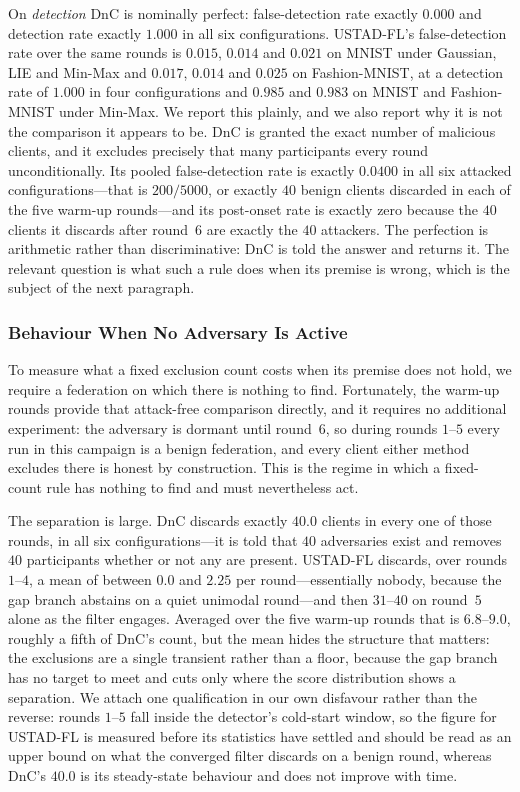 \documentclass[journal]{IEEEtran}
\begin{document}
On \emph{detection} DnC is nominally perfect: false-detection rate exactly $0.000$ and detection rate exactly $1.000$ in all six configurations. USTAD-FL's false-detection rate over the same rounds is $0.015$, $0.014$ and $0.021$ on MNIST under Gaussian, LIE and Min-Max and $0.017$, $0.014$ and $0.025$ on Fashion-MNIST, at a detection rate of $1.000$ in four configurations and $0.985$ and $0.983$ on MNIST and Fashion-MNIST under Min-Max. We report this plainly, and we also report why it is not the comparison it appears to be. DnC is granted the exact number of malicious clients, and it excludes precisely that many participants every round unconditionally. Its pooled false-detection rate is exactly $0.0400$ in all six attacked configurations---that is $200/5000$, or exactly $40$ benign clients discarded in each of the five warm-up rounds---and its post-onset rate is exactly zero because the $40$ clients it discards after round~$6$ are exactly the $40$ attackers. The perfection is arithmetic rather than discriminative: DnC is told the answer and returns it. The relevant question is what such a rule does when its premise is wrong, which is the subject of the next paragraph.

\subsubsection{Behaviour When No Adversary Is Active}
To measure what a fixed exclusion count costs when its premise does not hold, we require a
federation on which there is nothing to find. Fortunately, the warm-up rounds provide that
attack-free comparison directly, and it requires no additional experiment: the adversary is dormant until round~$6$, so during rounds $1$--$5$ every run in this campaign is a benign federation, and every client either method excludes there is honest by construction. This is the regime in which a fixed-count rule has nothing to find and must nevertheless act.

The separation is large. DnC discards exactly $40.0$ clients in every one of those rounds, in all six configurations---it is told that $40$ adversaries exist and removes $40$ participants whether or not any are present. USTAD-FL discards, over rounds $1$--$4$, a mean of between $0.0$ and $2.25$ per round---essentially nobody, because the gap branch abstains on a quiet unimodal round---and then $31$--$40$ on round~$5$ alone as the filter engages. Averaged over the five warm-up rounds that is $6.8$--$9.0$, roughly a fifth of DnC's count, but the mean hides the structure that matters: the exclusions are a single transient rather than a floor, because the gap branch has no target to meet and cuts only where the score distribution shows a separation. We attach one qualification in our own disfavour rather than the reverse: rounds $1$--$5$ fall inside the detector's cold-start window, so the figure for USTAD-FL is measured before its statistics have settled and should be read as an upper bound on what the converged filter discards on a benign round, whereas DnC's $40.0$ is its steady-state behaviour and does not improve with time.
\end{document}
